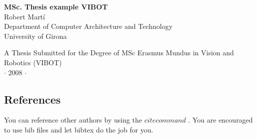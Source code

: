 \vspace*{1cm}
\begin{center}
{\Large\bf MSc. Thesis example VIBOT\\} \vspace{2cm} {\large
Robert Mart\'i\\
\vspace{1cm}
Department of Computer Architecture and Technology \\
University of Girona}

\end{center}

\vspace{2cm}
\begin{center}
{\large A Thesis Submitted for the Degree of MSc Erasmus Mundus in
Vision and Robotics (VIBOT)\\ \vspace{0.3cm} $\cdot$ 2008 $\cdot$}
\end{center}


\subsection{References}
You can reference other authors by using the $cite command$
\cite{Pokorski:1998hr}. You are encouraged to use bib files and
let bibtex do the job for you.
